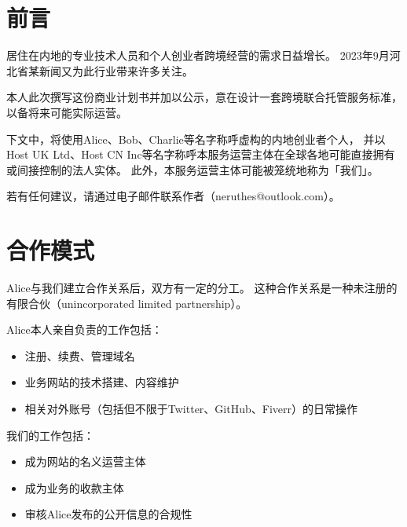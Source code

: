 \documentclass[a4paper,12pt]{report}
\begin{document}

\tableofcontents\clearpage



















\chapter{前言}
居住在内地的专业技术人员和个人创业者跨境经营的需求日益增长。
2023年9月河北省某新闻又为此行业带来许多关注。

本人此次撰写这份商业计划书并加以公示，意在设计一套跨境联合托管服务标准，以备将来可能实际运营。

下文中，将使用Alice、Bob、Charlie等名字称呼虚构的内地创业者个人，
并以Host UK Ltd、Host CN Inc等名字称呼本服务运营主体在全球各地可能直接拥有或间接控制的法人实体。
此外，本服务运营主体可能被笼统地称为「我们」。

若有任何建议，请通过电子邮件联系作者（neruthes@outlook.com）。


















\chapter{合作模式}
Alice与我们建立合作关系后，双方有一定的分工。
这种合作关系是一种未注册的有限合伙（unincorporated limited partnership）。

Alice本人亲自负责的工作包括：
\begin{itemize}
	\item 注册、续费、管理域名
	\item 业务网站的技术搭建、内容维护
	\item 相关对外账号（包括但不限于Twitter、GitHub、Fiverr）的日常操作
\end{itemize}

我们的工作包括：
\begin{itemize}
	\item 成为网站的名义运营主体
	\item 成为业务的收款主体
	\item 审核Alice发布的公开信息的合规性
\end{itemize}
\end{document}
